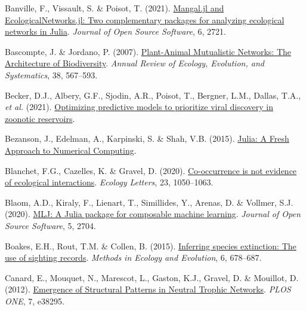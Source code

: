\documentclass[10pt,oneside]{article}
\newlength{\cslhangindent}
\newenvironment{CSLReferences}[3] %
 {%
  \setlength{\parindent}{0pt}
  \ifodd #1 \everypar{\setlength{\hangindent}{\cslhangindent}}\ignorespaces\fi
  \ifnum #2 > 0
  \setlength{\parskip}{#2\baselineskip}
  \fi
 }%
 {}
\begin{document}
\hypertarget{refs}{}
\begin{CSLReferences}{1}{0}
\leavevmode{}%
Banville, F., Vissault, S. \& Poisot, T. (2021).
\href{https://doi.org/10.21105/joss.02721}{Mangal.jl and
EcologicalNetworks.jl: Two complementary packages for analyzing
ecological networks in Julia}. \emph{Journal of Open Source Software},
6, 2721.

\leavevmode{}%
Bascompte, J. \& Jordano, P. (2007).
\href{https://doi.org/10.1146/annurev.ecolsys.38.091206.095818}{Plant-Animal
Mutualistic Networks: The Architecture of Biodiversity}. \emph{Annual
Review of Ecology, Evolution, and Systematics}, 38, 567--593.

\leavevmode{}%
Becker, D.J., Albery, G.F., Sjodin, A.R., Poisot, T., Bergner, L.M.,
Dallas, T.A., \emph{et al.} (2021).
\href{https://doi.org/10.1101/2020.05.22.111344}{Optimizing predictive
models to prioritize viral discovery in zoonotic reservoirs}.

\leavevmode{}%
Bezanson, J., Edelman, A., Karpinski, S. \& Shah, V.B. (2015).
\href{https://doi.org/10.48550/arXiv.1411.1607}{Julia: A Fresh Approach
to Numerical Computing}.

\leavevmode{}%
Blanchet, F.G., Cazelles, K. \& Gravel, D. (2020).
\href{https://doi.org/10.1111/ele.13525}{Co-occurrence is not evidence
of ecological interactions}. \emph{Ecology Letters}, 23, 1050--1063.

\leavevmode{}%
Blaom, A.D., Kiraly, F., Lienart, T., Simillides, Y., Arenas, D. \&
Vollmer, S.J. (2020). \href{https://doi.org/10.21105/joss.02704}{MLJ: A
Julia package for composable machine learning}. \emph{Journal of Open
Source Software}, 5, 2704.

\leavevmode{}%
Boakes, E.H., Rout, T.M. \& Collen, B. (2015).
\href{https://doi.org/10.1111/2041-210X.12365}{Inferring species
extinction: The use of sighting records}. \emph{Methods in Ecology and
Evolution}, 6, 678--687.

\leavevmode{}%
Canard, E., Mouquet, N., Marescot, L., Gaston, K.J., Gravel, D. \&
Mouillot, D. (2012).
\href{https://doi.org/10.1371/journal.pone.0038295}{Emergence of
Structural Patterns in Neutral Trophic Networks}. \emph{PLOS ONE}, 7,
e38295.


\end{CSLReferences}
\end{document}
